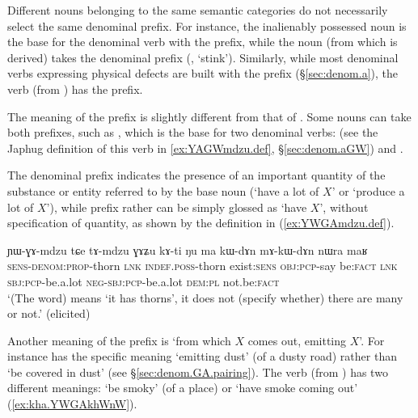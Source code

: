 Different nouns belonging to the same semantic categories do not necessarily select the same denominal prefix. For instance, the inalienably possessed noun  is the base for the denominal verb  with the  prefix, while the noun  (from which  is derived) takes the  denominal prefix (, `stink'). Similarly, while most denominal verbs expressing physical defects are built with the  prefix (§\ref{sec:denom.a}), the verb  (from ) has the  prefix.

The meaning of the  prefix is slightly different from that of . Some nouns can take both prefixes, such as , which is the base for two denominal verbs:  (see the Japhug definition of this verb in \ref{ex:YAGWmdzu.def}, §\ref{sec:denom.aGW}) and . 

The  denominal prefix indicates the presence of an important quantity of the substance or entity referred to by the base noun (`have a lot of $X$' or `produce a lot of $X$'), while  prefix rather can be simply glossed as `have $X$', without specification of quantity, as shown by the definition in (\ref{ex:YWGAmdzu.def}).

\begin{exe}
\ex \label{ex:YWGAmdzu.def}
 \gll ɲɯ-ɣɤ-mdzu tɕe tɤ-mdzu ɣɤʑu kɤ-ti ŋu ma kɯ-dɤn mɤ-kɯ-dɤn nɯra maʁ\\
 \textsc{sens}-\textsc{denom}:\textsc{prop}-thorn \textsc{lnk} \textsc{indef}.\textsc{poss}-thorn exist:\textsc{sens} \textsc{obj}:\textsc{pcp}-say be:\textsc{fact}  \textsc{lnk} \textsc{sbj}:\textsc{pcp}-be.a.lot \textsc{neg}-\textsc{sbj}:\textsc{pcp}-be.a.lot \textsc{dem}:\textsc{pl} not.be:\textsc{fact}\\
 \glt `(The word)  means `it has thorns', it does not (specify whether) there are many or not.' (elicited)
\end{exe}

Another meaning of the  prefix is `from which $X$ comes out, emitting $X$'. For instance  has the specific meaning `emitting dust' (of a dusty road) rather than `be covered in dust' (see §\ref{sec:denom.GA.pairing}). The verb  (from ) has two different meanings: `be smoky' (of a place) or `have smoke coming out' (\ref{ex:kha.YWGAkhWnW}). 

